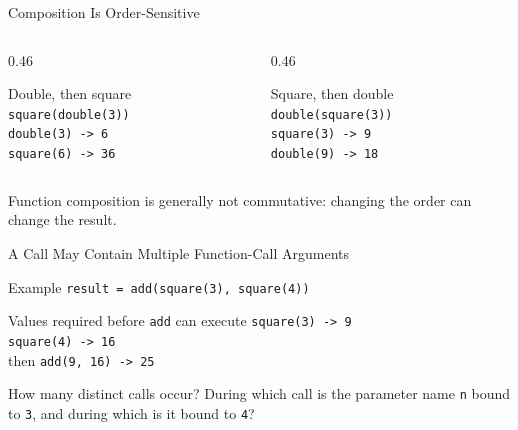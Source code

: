 \documentclass[aspectratio=169,10pt]{beamer}
\begin{document}
\begin{frame}{Composition Is Order-Sensitive}
  \begin{columns}[T,onlytextwidth]
    \begin{column}{0.46\textwidth}
      \begin{block}{Double, then square}
        \texttt{square(double(3))}\\[0.06in]
        \texttt{double(3) -> 6}\\
        \texttt{square(6) -> 36}
      \end{block}
    \end{column}

    \begin{column}{0.46\textwidth}
      \begin{block}{Square, then double}
        \texttt{double(square(3))}\\[0.06in]
        \texttt{square(3) -> 9}\\
        \texttt{double(9) -> 18}
      \end{block}
    \end{column}
  \end{columns}

  \begin{keyidea}
    Function composition is generally not commutative: changing the order can change the result.
  \end{keyidea}
\end{frame}

\begin{frame}{A Call May Contain Multiple Function-Call Arguments}
  \begin{block}{Example}
    \centering
    \Large\texttt{result = add(square(3), square(4))}
  \end{block}

  \begin{block}{Values required before \texttt{add} can execute}
    \texttt{square(3) -> 9}\\
    \texttt{square(4) -> 16}\\[0.06in]
    then \texttt{add(9, 16) -> 25}
  \end{block}

  \begin{activity}
    How many distinct calls occur? During which call is the parameter name \texttt{n} bound to \texttt{3}, and during which is it bound to \texttt{4}?
  \end{activity}
\end{frame}
\end{document}
